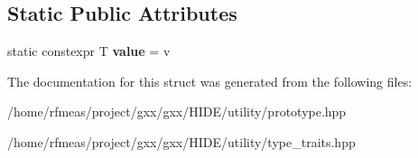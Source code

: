 \subsection*{Static Public Attributes}
\begin{DoxyCompactItemize}
\item 
static constexpr T {\bfseries value} = v\hypertarget{structintegral__constant_af8e69c0007bbeaf853b18fd088036db2}{}\label{structintegral__constant_af8e69c0007bbeaf853b18fd088036db2}

\end{DoxyCompactItemize}


The documentation for this struct was generated from the following files\+:\begin{DoxyCompactItemize}
\item 
/home/rfmeas/project/gxx/gxx/\+H\+I\+D\+E/utility/prototype.\+hpp\item 
/home/rfmeas/project/gxx/gxx/\+H\+I\+D\+E/utility/type\+\_\+traits.\+hpp\end{DoxyCompactItemize}
